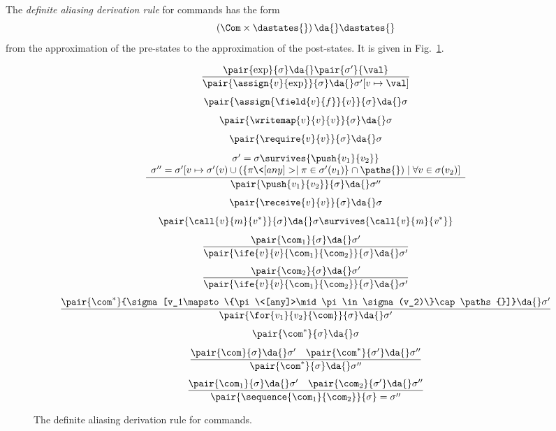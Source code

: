\begin{definition}
%
  The \emph{definite aliasing derivation rule} for commands has the form
  \[
  \left(\Com\times\dastates{}\right)\da{}\dastates{}
  \]
  from the approximation of the pre-states to the approximation of the post-states.
  It is given in Fig.~\ref{fig:daa_commands}.
%
  \begin{figure}[t]
    \begin{gather*}
      \frac{\pair{\exp}{\sigma}\da{}\pair{\sigma'}{\val}}{\pair{\assign{v}{\exp}}{\sigma}\da{}\sigma'[v\mapsto\val]}\\[4pt]
      \pair{\assign{\field{v}{f}}{v}}{\sigma}\da{}\sigma\\[4pt]
      \pair{\writemap{v}{v}{v}}{\sigma}\da{}\sigma\\[4pt]
      \pair{\require{v}{v}}{\sigma}\da{}\sigma\\[4pt]
      \frac{\begin{array}{c}
          \sigma'=\sigma\survives{\push{v_1}{v_2}}\\
          \sigma''=\sigma'[v\mapsto\sigma'(v)\cup(\{\pi\<[any]>\mid\pi\in\sigma'(v_1)\}\cap\paths{})\mid\forall v\in\sigma(v_2)]
      \end{array}}{\pair{\push{v_1}{v_2}}{\sigma}\da{}\sigma''}\\[4pt]
      \pair{\receive{v}{v}}{\sigma}\da{}\sigma\\[4pt]
      \pair{\call{v}{m}{v^*}}{\sigma}\da{}\sigma\survives{\mathit{\call{v}{m}{v^*}}}\\[4pt]
      \frac{\pair{\com_1}{\sigma}\da{}\sigma'}{\pair{\ife{v}{v}{\com_1}{\com_2}}{\sigma}\da{}\sigma'}\\[4pt]
      \frac{\pair{\com_2}{\sigma}\da{}\sigma'}{\pair{\ife{v}{v}{\com_1}{\com_2}}{\sigma}\da{}\sigma'}\\[4pt]
      \frac{\pair{\com^*}{\sigma[v_1\mapsto\{\pi\<[any]>\mid\pi\in\sigma(v_2)\}\cap\paths{}]}\da{}\sigma'}{\pair{\for{v_1}{v_2}{\com}}{\sigma}\da{}\sigma'}\\[4pt]
      \pair{\com^*}{\sigma}\da{}\sigma\\[4pt]
      \frac{\pair{\com}{\sigma}\da{}\sigma'\quad\pair{\com^*}{\sigma'}\da{}\sigma''}{\pair{\com^*}{\sigma}\da{}\sigma''}\\[4pt]
      \frac{\pair{\com_1}{\sigma}\da{}\sigma'\quad\pair{\com_2}{\sigma'}\da{}\sigma''}{\pair{\sequence{\com_1}{\com_2}}{\sigma}=\sigma''}
    \end{gather*}
    \caption{The definite aliasing derivation rule for commands.}
    \label{fig:daa_commands}
  \end{figure}
%
\end{definition}

